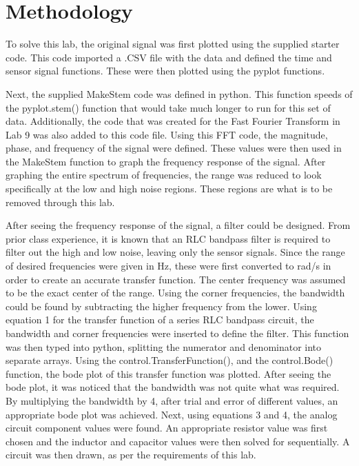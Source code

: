 \documentclass[12pt, titlepage]{article}
\begin{document}
    \section{Methodology}
    To solve this lab, the original signal was first plotted using the supplied starter code.  This code imported a .CSV file with the data and defined the time and sensor signal functions.  These were then plotted using the pyplot functions.
    
    Next, the supplied MakeStem code was defined in python.  This function speeds of the pyplot.stem() function that would take much longer to run for this set of data.  Additionally, the code that was created for the Fast Fourier Transform in Lab 9 was also added to this code file.  Using this FFT code, the magnitude, phase, and frequency of the signal were defined.  These values were then used in the MakeStem function to graph the frequency response of the signal.  After graphing the entire spectrum of frequencies, the range was reduced to look specifically at the low and high noise regions.  These regions are what is to be removed through this lab.
    
    After seeing the frequency response of the signal, a filter could be designed.  From prior class experience, it is known that an RLC bandpass filter is required to filter out the high and low noise, leaving only the sensor signals.  Since the range of desired frequencies were given in Hz, these were first converted to rad/s in order to create an accurate transfer function.  The center frequency was assumed to be the exact center of the range.  Using the corner frequencies, the bandwidth could be found by subtracting the higher frequency from the lower. Using equation 1 for the transfer function of a series RLC bandpass circuit, the bandwidth and corner frequencies were inserted to define the filter.  This function was then typed into python, splitting the numerator and denominator into separate arrays.  Using the control.TransferFunction(), and the control.Bode() function, the bode plot of this transfer function was plotted.  After seeing the bode plot, it was noticed that the bandwidth was not quite what was required.  By multiplying the bandwidth by 4, after trial and error of different values, an appropriate bode plot was achieved.  Next, using equations 3 and 4, the analog circuit component values were found. An appropriate resistor value was first chosen and the inductor and capacitor values were then solved for sequentially.  A circuit was then drawn, as per the requirements of this lab.
    
\end{document}

